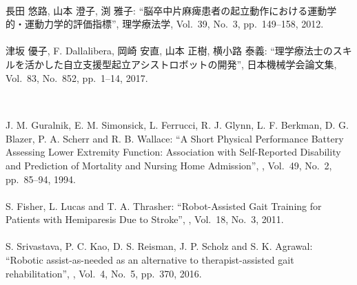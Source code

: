 \begin{mythebibliography}{99}
\leavevmode \\
長田 悠路, 山本 澄子, 渕 雅子:
\newblock ``脳卒中片麻痺患者の起立動作における運動学的・運動力学的評価指標'',
\newblock 理学療法学, Vol.~39, No.~3, pp.~149--158, 2012.
\\

\leavevmode \\
津坂 優子, F. Dallalibera, 岡崎 安直, 山本 正樹, 横小路 泰義:
\newblock ``理学療法士のスキルを活かした自立支援型起立アシストロボットの開発'',
\newblock 日本機械学会論文集, Vol.~83, No.~852, pp.~1--14, 2017.
\\


\newpage
\subsection*{}

\leavevmode \\
J. M. Guralnik, E. M. Simonsick, L. Ferrucci, R. J. Glynn, L. F. Berkman, D. G. Blazer, P. A. Scherr and R. B. Wallace:
\newblock ``A Short Physical Performance Battery Assessing Lower Extremity Function: Association with Self-Reported Disability and Prediction of Mortality and Nursing Home Admission'',
, Vol.~49, No.~2, pp.~85--94, 1994. 
\\

\leavevmode \\
S. Fisher, L. Lucas and T. A. Thrasher:
\newblock ``Robot-Assisted Gait Training for Patients with Hemiparesis Due to Stroke'',
, Vol.~18, No.~3, 2011. 
\\

\leavevmode \\
S. Srivastava, P. C. Kao, D. S. Reisman, J. P. Scholz and S. K. Agrawal:
\newblock ``Robotic assist-as-needed as an alternative to therapist-assisted gait rehabilitation'',
, Vol.~4, No.~5, pp.~370, 2016. 
\\


\end{mythebibliography}

